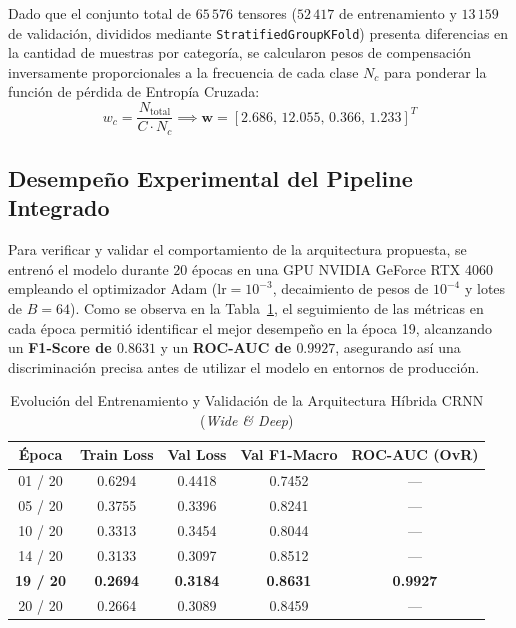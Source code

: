 \documentclass[journal, a4paper]{IEEEtran}
\begin{document}
Dado que el conjunto total de $65\,576$ tensores ($52\,417$ de entrenamiento y $13\,159$ de validación, divididos mediante \texttt{StratifiedGroupKFold}) presenta diferencias en la cantidad de muestras por categoría, se calcularon pesos de compensación inversamente proporcionales a la frecuencia de cada clase $N_c$ para ponderar la función de pérdida de Entropía Cruzada:
\begin{equation}
    w_c = \frac{N_{\text{total}}}{C \cdot N_c} \implies \mathbf{w} = [2.686, \, 12.055, \, 0.366, \, 1.233]^T
\end{equation}

\subsection{Desempeño Experimental del Pipeline Integrado}
Para verificar y validar el comportamiento de la arquitectura propuesta, se entrenó el modelo durante $20$ épocas en una GPU NVIDIA GeForce RTX 4060 empleando el optimizador Adam ($\text{lr} = 10^{-3}$, decaimiento de pesos de $10^{-4}$ y lotes de $B = 64$). Como se observa en la Tabla~\ref{tab:resultados_crnn}, el seguimiento de las métricas en cada época permitió identificar el mejor desempeño en la época 19, alcanzando un \textbf{F1-Score de $0.8631$} y un \textbf{ROC-AUC de $0.9927$}, asegurando así una discriminación precisa antes de utilizar el modelo en entornos de producción.

\begin{table}[htbp]
\centering
\caption{Evolución del Entrenamiento y Validación de la Arquitectura Híbrida CRNN (\textit{Wide \& Deep})}
\label{tab:resultados_crnn}
\begin{tabular}{ccccc}
\toprule
\textbf{Época} & \textbf{Train Loss} & \textbf{Val Loss} & \textbf{Val F1-Macro} & \textbf{ROC-AUC (OvR)} \\
\midrule
01 / 20 & 0.6294 & 0.4418 & 0.7452 & --- \\
05 / 20 & 0.3755 & 0.3396 & 0.8241 & --- \\
10 / 20 & 0.3313 & 0.3454 & 0.8044 & --- \\
14 / 20 & 0.3133 & 0.3097 & 0.8512 & --- \\
\textbf{19 / 20} & \textbf{0.2694} & \textbf{0.3184} & \textbf{0.8631} & \textbf{0.9927} \\
20 / 20 & 0.2664 & 0.3089 & 0.8459 & --- \\
\bottomrule
\end{tabular}
\end{table}
\end{document}
